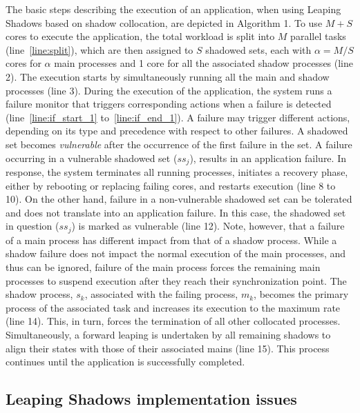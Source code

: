 The basic steps describing the execution of an application, when using Leaping Shadows based on shadow collocation, are depicted in Algorithm 1.
To use $M+S$ cores to execute the application, the total workload is split into $M$ parallel tasks (line~\ref{line:split}), %
 which are then assigned to $S$ shadowed sets, each with $\alpha=M/S$ cores for $\alpha$ main processes and 1 core for all the associated shadow processes (line 2).  
The execution starts by simultaneously running all the main and shadow processes (line 3).
During the execution of the application,
the system runs a failure monitor that triggers corresponding actions when a failure is detected (line~\ref{line:if_start_1} to~\ref{line:if_end_1}). A failure may trigger different actions, depending on its type and precedence with respect to other failures.  A shadowed set becomes {\it vulnerable} after the occurrence of the first failure in the set. A failure occurring in a vulnerable shadowed set ($ss_j$), results in an application failure. In response, the system terminates all running 
processes, initiates a recovery phase, either by rebooting or replacing failing cores,  and restarts execution (line 8 to 10). %
On the other hand, failure in a non-vulnerable shadowed set
can be tolerated and does not translate into an application failure. In this case, the shadowed set in question ($ss_j$) is marked as vulnerable (line 12). Note, however, that a failure of a main process has different impact from that of a  shadow process.  While a shadow 
failure does not impact the normal execution of the main processes, and thus can be ignored, failure of the main process forces the remaining main processes to suspend execution after they reach their synchronization point.  The shadow process, $s_k$, associated with the failing process, $m_k$,  becomes the primary process of the associated task and increases its execution to the maximum rate (line 14). This, in turn, forces the termination of all other collocated processes.  Simultaneously, a forward leaping is undertaken by all remaining shadows to align their states with those of their associated mains (line 15).  
This process continues until the application is successfully completed.

\subsection{Leaping Shadows implementation issues}

